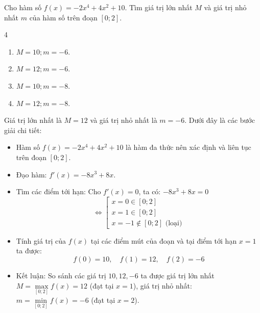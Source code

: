 \begin{baitap}
	Cho hàm số $f(x) = -2x^4 + 4x^2 + 10$. Tìm giá trị lớn nhất $M$ và giá trị nhỏ nhất $m$ của hàm số trên đoạn $[0; 2]$.
	\begin{multicols}{4}
		\begin{enumerate}
			\item $M = 10; m = -6$.
			\item $M = 12; m = -6$.
			\item $M = 10; m = -8$.
			\item $M = 12; m = -8$.
		\end{enumerate}
	\end{multicols}
	\begin{traloi}
		Giá trị lớn nhất là $M = 12$ và giá trị nhỏ nhất là $m = -6$. Dưới đây là các bước giải chi tiết:
		\begin{itemize}
			\item Hàm số $f(x) = -2x^4 + 4x^2 + 10$ là hàm đa thức nên xác định và liên tục trên đoạn $[0; 2]$.
			\item Đạo hàm: $f'(x) = -8x^3 + 8x$.
			\item Tìm các điểm tới hạn: Cho $f'(x) = 0$, ta có: $-8x^3 + 8x = 0 $ $$\iff \left[\begin{array}{l} x = 0 \in [0; 2] \\ x = 1 \in [0; 2] \\ x = -1 \notin [0; 2] \text{ (loại)} \end{array}\right.$$
			\item Tính giá trị của $f(x)$ tại các điểm mút của đoạn và tại điểm tới hạn $x = 1$ ta được:
			$$f(0) = 10,\quad f(1) = 12, \quad f(2) = -6$$
			\item Kết luận: So sánh các giá trị $10, 12, -6$ ta được giá trị lớn nhất $M = \max\limits_{[0; 2]} f(x) = 12$ (đạt tại $x = 1$), giá trị nhỏ nhất: $m = \min\limits_{[0; 2]} f(x) = -6$ (đạt tại $x = 2$).
		\end{itemize}
	\end{traloi}
\end{baitap}


